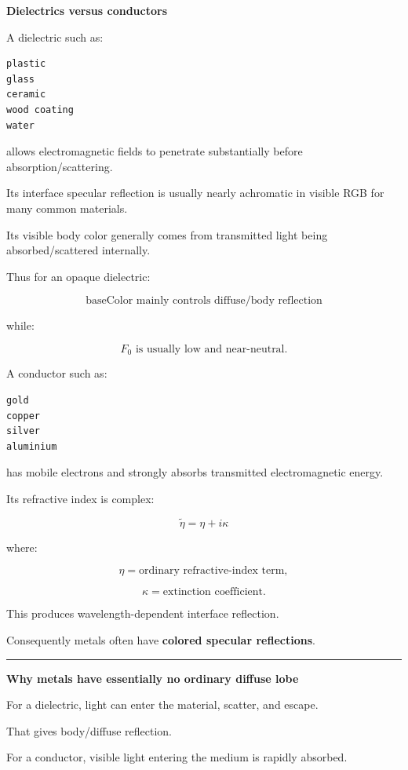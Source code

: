 \textbf{Dielectrics versus conductors}

A dielectric such as:

\begin{verbatim}
plastic
glass
ceramic
wood coating
water
\end{verbatim}

allows electromagnetic fields to penetrate substantially before absorption/scattering.

Its interface specular reflection is usually nearly achromatic in visible RGB for many common materials.

Its visible body color generally comes from transmitted light being absorbed/scattered internally.

Thus for an opaque dielectric:

\[
\boxed{
\text{baseColor mainly controls diffuse/body reflection}
}
\]

while:

\[
\boxed{
F_0\text{ is usually low and near-neutral}.
}
\]

A conductor such as:

\begin{verbatim}
gold
copper
silver
aluminium
\end{verbatim}

has mobile electrons and strongly absorbs transmitted electromagnetic energy.

Its refractive index is complex:

\[
\boxed{
\tilde{\eta}
=
\eta+i\kappa
}
\]

where:

\[
\eta=\text{ordinary refractive-index term},
\]

\[
\kappa=\text{extinction coefficient}.
\]

This produces wavelength-dependent interface reflection.

Consequently metals often have \textbf{colored specular reflections}.

\begin{center}\rule{0.5\linewidth}{0.5pt}\end{center}

\textbf{Why metals have essentially no ordinary diffuse lobe}

For a dielectric, light can enter the material, scatter, and escape.

That gives body/diffuse reflection.

For a conductor, visible light entering the medium is rapidly absorbed.

